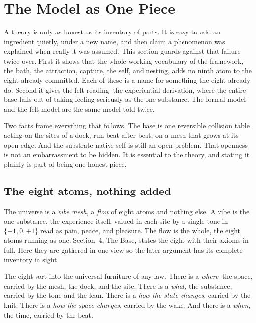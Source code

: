 \section{The Model as One Piece}

A theory is only as honest as its inventory of parts. It is easy to add an ingredient quietly, under a new name, and then claim a phenomenon was explained when really it was assumed. This section guards against that failure twice over. First it shows that the whole working vocabulary of the framework, the bath, the attraction, capture, the self, and nesting, adds no ninth atom to the eight already committed. Each of these is a name for something the eight already do. Second it gives the felt reading, the experiential derivation, where the entire base falls out of taking feeling seriously as the one substance. The formal model and the felt model are the same model told twice.

Two facts frame everything that follows. The base is one reversible collision table acting on the sites of a dock, run beat after beat, on a mesh that grows at its open edge. And the substrate-native self is still an open problem. That openness is not an embarrassment to be hidden. It is essential to the theory, and stating it plainly is part of being one honest piece.

\subsection{The eight atoms, nothing added}

The universe is a \emph{vibe mesh}, a \emph{flow} of eight atoms and nothing else. A vibe is the one substance, the experience itself, valued in each site by a single tone in $\{-1, 0, +1\}$ read as pain, peace, and pleasure. The flow is the whole, the eight atoms running as one. Section~4, The Base, states the eight with their axioms in full. Here they are gathered in one view so the later argument has its complete inventory in sight.

The eight sort into the universal furniture of any law. There is a \emph{where}, the space, carried by the mesh, the dock, and the site. There is a \emph{what}, the substance, carried by the tone and the lean. There is a \emph{how the state changes}, carried by the knit. There is a \emph{how the space changes}, carried by the wake. And there is a \emph{when}, the time, carried by the beat.


